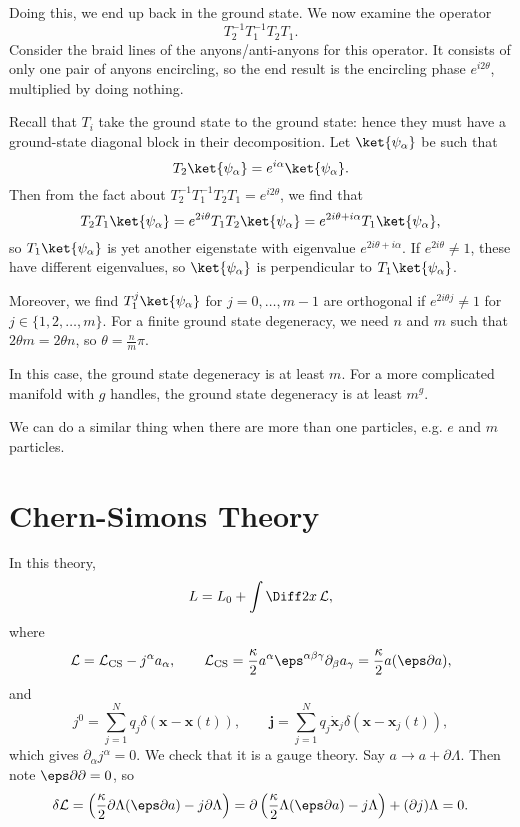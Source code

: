 \documentclass[12pt]{article}
\begin{document}
Doing this, we end up back in the ground state. We now examine the operator
\[
T_2^{-1} T_1^{-1} T_2 T_1.
\]
Consider the braid lines of the anyons/anti-anyons for this operator. It consists of only one pair of anyons encircling, so the end result is the encircling phase $e^{i 2 \theta}$, multiplied by doing nothing.


Recall that $T_i$ take the ground state to the ground state: hence they must have a ground-state diagonal block in their decomposition. Let $\ket{\psi_\alpha}$ be such that
\[
	T_2 \ket{\psi_\alpha} = e^{i \alpha} \ket{\psi_\alpha}.
\]
Then from the fact about $T_2^{-1}T_1^{-1}T_2T_1 = e^{i2\theta}$, we find that
\[
	T_2 T_1 \ket{\psi_\alpha} = e^{2 i \theta} T_1 T_2 \ket{\psi_\alpha} = e^{2i\theta + i \alpha} T_1 \ket{\psi_\alpha},
\]
so $T_1 \ket{\psi_\alpha}$ is yet another eigenstate with eigenvalue $e^{2i\theta + i\alpha}$. If $e^{2i\theta} \neq 1$, these have different eigenvalues, so $\ket{\psi_\alpha}$ is perpendicular to $T_1 \ket{\psi_\alpha}$.

Moreover, we find $T_1^{j}\ket{\psi_\alpha}$ for $j = 0, \ldots, m-1$ are orthogonal if $e^{2i\theta j} \neq 1$ for $j \in \{1, 2, \ldots, m\}$. For a finite ground state degeneracy, we need $n$ and $m$ such that $2 \theta m = 2 \theta n$, so $\theta = \frac nm \pi$.

In this case, the ground state degeneracy is at least $m$. For a more complicated manifold with $g$ handles, the ground state degeneracy is at least $m^{g}$.

We can do a similar thing when there are more than one particles, e.g. $e$ and $m$ particles.

\newpage

\section{Chern-Simons Theory}%
\label{sec:cst}

In this theory,
\[
L = L_0 + \int \Diff2x \, \mathcal{L},
\]
where
\[
\mathcal{L} = \mathcal{L}_{\mathrm{CS}} - j^{\alpha} a_\alpha, \qquad \mathcal{L}_{\mathrm{CS}} = \frac{\kappa}{2} a^{\alpha} \eps^{\alpha\beta\gamma} \partial_\beta a_\gamma = \frac{\kappa}{2} a(\eps \partial a),
\]
and
\[
j^0 = \sum_{j = 1}^N q_j \delta(\mathbf{x} - \mathbf{x}(t)), \qquad \mathbf{j} = \sum_{j = 1}^{N} q_j \mathbf{\dot x}_j \delta(\mathbf{x} - \mathbf{x}_j(t)),
\]
which gives $\partial_\alpha j^\alpha = 0$. We check that it is a gauge theory. Say $a \to a + \partial \Lambda$. Then note $\eps \partial \partial = 0$, so
\[
\delta \mathcal{L} = \left( \frac{\kappa}{2} \partial \Lambda (\eps \partial a) - j \partial \Lambda\right) = \partial \left( \frac{\kappa}{2} \Lambda(\eps \partial a) - j \Lambda \right) + (\partial j)\Lambda = 0.
\]
\end{document}
